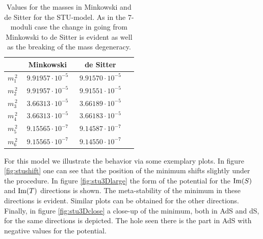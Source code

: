 \documentclass[a4paper,12pt]{report}
\def\rmim{{\rm Im}}
\begin{document}
\begin{table}[htb]
\centering
\begin{tabular}{|c|c|c|c|}\hline
&  Minkowski  & de Sitter \\\hline
$m_1^{\,2}$ & $\; 9.91957 \cdot 10^{-5} \;$ & $\; 9.91570 \cdot 10^{-5} \;$ \\\hline
$m_2^{\,2}$ & $\; 9.91957 \cdot 10^{-5} \;$ & $\; 9.91551 \cdot 10^{-5} \;$ \\\hline
$m_3^{\,2}$ & $\; 3.66313 \cdot 10^{-5} \;$ & $\; 3.66189 \cdot 10^{-5} \;$ \\\hline
$m_4^{\,2}$ & $\; 3.66313 \cdot 10^{-5} \;$ & $\; 3.66183 \cdot 10^{-5} \;$ \\\hline
$m_5^{\,2}$ & $\; 9.15565 \cdot 10^{-7} \;$ & $\; 9.14587 \cdot 10^{-7} \;$ \\\hline
$m_6^{\,2}$ & $\; 9.15565 \cdot 10^{-7} \;$ & $\; 9.14550 \cdot 10^{-7} \;$ \\\hline
\end{tabular}
\caption{  Values for the masses in Minkowski and de Sitter for the STU-model. As in the 7-moduli case the change in  going from Minkowski to de Sitter is evident as well as the breaking of the mass degeneracy.}
\label{tab:stumass}
\end{table} For this model we illustrate the behavior via some exemplary plots. In figure \ref{fig:stushift} one can see that the position of the minimum shifts slightly under the procedure. In figure \ref{fig:stu3Dlarge} the form of the potential for the $\rmim(S)$ and $\rmim(T)$ directions is shown. The meta-stability of the minimum in these directions is evident. Similar plots can be obtained for the other directions. Finally, in figure \ref{fig:stu3Dclose} a close-up of the minimum, both in AdS and dS, for the same directions is depicted. The hole seen there is the part in AdS with negative values for the potential.
\end{document}
